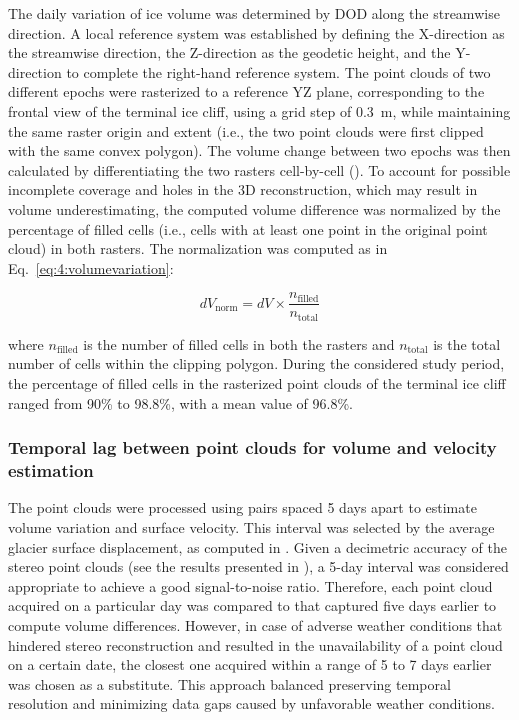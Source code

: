 The daily variation of ice volume was determined by DOD along the streamwise direction. 
A local reference system was established by defining the X-direction as the streamwise direction, the Z-direction as the geodetic height, and the Y-direction to complete the right-hand reference system.
The point clouds of two different epochs were rasterized to a reference YZ plane, corresponding to the frontal view of the terminal ice cliff, using a grid step of 0.3~m, while maintaining the same raster origin and extent (i.e., the two point clouds were first clipped with the same convex polygon).
The volume change between two epochs was then calculated by differentiating the two rasters cell-by-cell ().
To account for possible incomplete coverage and holes in the 3D reconstruction, which may result in volume underestimating, the computed volume difference was normalized by the percentage of filled cells (i.e., cells with at least one point in the original point cloud) in both rasters.
The normalization was computed as in Eq.~\ref{eq:4:volumevariation}:

\begin{equation}
  dV_{\text{norm}} = dV \times
  \frac{n_{\text{filled}}}{n_{\text{total}}}
  \label{eq:4:volumevariation}
\end{equation}

where \( n_{\text{filled}} \) is the number of filled cells in both the rasters and \(n_{\text{total}} \) is the total number of cells within the clipping polygon.
During the considered study period, the percentage of filled cells in the rasterized point clouds of the terminal ice cliff ranged from 90\% to 98.8\%, with a mean value of 96.8\%.


\subsubsection{Temporal lag between point clouds for volume and velocity estimation}
\label{sec:4:timelag}

The point clouds were processed using pairs spaced 5 days apart to estimate volume variation and surface velocity.
This interval was selected by the average glacier surface displacement, as computed in .
Given a decimetric accuracy of the stereo point clouds (see the results presented in ), a 5-day interval was considered appropriate to achieve a good signal-to-noise ratio.
Therefore, each point cloud acquired on a particular day was compared to that captured five days earlier to compute volume differences.
However, in case of adverse weather conditions that hindered stereo reconstruction and resulted in the unavailability of a point cloud on a certain date, the closest one acquired within a range of 5 to 7 days earlier was chosen as a substitute.
This approach balanced preserving temporal resolution and minimizing data gaps caused by unfavorable weather conditions.

